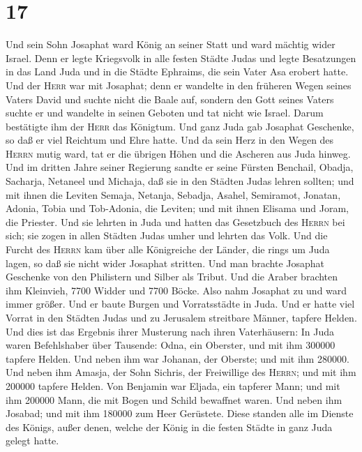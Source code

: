 \hypertarget{section-16}{%
\section{17}\label{section-16}}

 Und sein Sohn Josaphat ward König an seiner Statt und
ward mächtig wider Israel.  Denn er legte Kriegsvolk in
alle festen Städte Judas und legte Besatzungen in das Land Juda und in
die Städte Ephraims, die sein Vater Asa erobert hatte. 
Und der \textsc{Herr} war mit Josaphat; denn er wandelte in den früheren
Wegen seines Vaters David und suchte nicht die Baale auf, 
sondern den Gott seines Vaters suchte er und wandelte in seinen Geboten
und tat nicht wie Israel.  Darum bestätigte ihm der
\textsc{Herr} das Königtum. Und ganz Juda gab Josaphat Geschenke, so daß
er viel Reichtum und Ehre hatte.  Und da sein Herz in den
Wegen des \textsc{Herrn} mutig ward, tat er die übrigen Höhen und die
Ascheren aus Juda hinweg.  Und im dritten Jahre seiner
Regierung sandte er seine Fürsten Benchail, Obadja, Sacharja, Netaneel
und Michaja, daß sie in den Städten Judas lehren sollten; 
und mit ihnen die Leviten Semaja, Netanja, Sebadja, Asahel, Semiramot,
Jonatan, Adonia, Tobia und Tob-Adonia, die Leviten; und mit ihnen
Elisama und Joram, die Priester.  Und sie lehrten in Juda
und hatten das Gesetzbuch des \textsc{Herrn} bei sich; sie zogen in
allen Städten Judas umher und lehrten das Volk.  Und die
Furcht des \textsc{Herrn} kam über alle Königreiche der Länder, die
rings um Juda lagen, so daß sie nicht wider Josaphat stritten.
 Und man brachte Josaphat Geschenke von den Philistern
und Silber als Tribut. Und die Araber brachten ihm Kleinvieh, 7700
Widder und 7700 Böcke.  Also nahm Josaphat zu und ward
immer größer. Und er baute Burgen und Vorratsstädte in Juda.
 Und er hatte viel Vorrat in den Städten Judas und zu
Jerusalem streitbare Männer, tapfere Helden.  Und dies
ist das Ergebnis ihrer Musterung nach ihren Vaterhäusern: In Juda waren
Befehlshaber über Tausende: Odna, ein Oberster, und mit ihm 300000
tapfere Helden.  Und neben ihm war Johanan, der Oberste;
und mit ihm 280000.  Und neben ihm Amasja, der Sohn
Sichris, der Freiwillige des \textsc{Herrn}; und mit ihm 200000 tapfere
Helden.  Von Benjamin war Eljada, ein tapferer Mann; und
mit ihm 200000 Mann, die mit Bogen und Schild bewaffnet waren.
 Und neben ihm Josabad; und mit ihm 180000 zum Heer
Gerüstete.  Diese standen alle im Dienste des Königs,
außer denen, welche der König in die festen Städte in ganz Juda gelegt
hatte.

